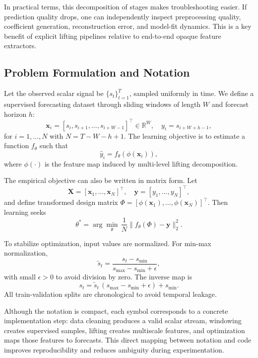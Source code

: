 \documentclass[journal]{IEEEtran}
\begin{document}
In practical terms, this decomposition of stages makes troubleshooting easier. If prediction quality drops, one can independently inspect preprocessing quality, coefficient generation, reconstruction error, and model-fit dynamics. This is a key benefit of explicit lifting pipelines relative to end-to-end opaque feature extractors.

\subsection{Problem Formulation and Notation}
Let the observed scalar signal be $\{s_t\}_{t=1}^{T}$, sampled uniformly in time. We define a supervised forecasting dataset through sliding windows of length $W$ and forecast horizon $h$:
\begin{equation}
\mathbf{x}_i=[s_i,s_{i+1},\ldots,s_{i+W-1}]^\top \in \mathbb{R}^{W}, \quad
y_i=s_{i+W+h-1},
\end{equation}
for $i=1,\ldots,N$ with $N=T-W-h+1$. The learning objective is to estimate a function $f_{\theta}$ such that
\begin{equation}
\hat{y}_i=f_{\theta}(\phi(\mathbf{x}_i)),
\end{equation}
where $\phi(\cdot)$ is the feature map induced by multi-level lifting decomposition.

The empirical objective can also be written in matrix form. Let
\begin{equation}
\mathbf{X}=[\mathbf{x}_1,\ldots,\mathbf{x}_N]^\top,\quad
\mathbf{y}=[y_1,\ldots,y_N]^\top,
\end{equation}
and define transformed design matrix $\Phi=[\phi(\mathbf{x}_1),\ldots,\phi(\mathbf{x}_N)]^\top$. Then learning seeks
\begin{equation}
\theta^*=\arg\min_{\theta}\,\frac{1}{N}\|f_{\theta}(\Phi)-\mathbf{y}\|_2^2.
\end{equation}

To stabilize optimization, input values are normalized. For min-max normalization,
\begin{equation}
\tilde{s}_t=\frac{s_t-s_{\min}}{s_{\max}-s_{\min}+\epsilon},
\end{equation}
with small $\epsilon>0$ to avoid division by zero. The inverse map is
\begin{equation}
s_t=\tilde{s}_t\,(s_{\max}-s_{\min}+\epsilon)+s_{\min}.
\end{equation}
All train-validation splits are chronological to avoid temporal leakage.

Although the notation is compact, each symbol corresponds to a concrete implementation step: data cleaning produces a valid scalar stream, windowing creates supervised samples, lifting creates multiscale features, and optimization maps those features to forecasts. This direct mapping between notation and code improves reproducibility and reduces ambiguity during experimentation.
\end{document}

